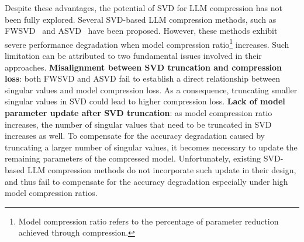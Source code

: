 Despite these advantages, the potential of SVD for LLM compression has not been fully explored. Several SVD-based LLM compression methods, such as FWSVD~\citep{DBLP:conf/iclr/HsuHCLSJ22} and ASVD~\citep{DBLP:journals/corr/abs-2312-05821} have been proposed. However, these methods exhibit severe performance degradation when model compression ratio\footnote{Model compression ratio refers to the percentage of parameter reduction achieved through compression.} increases. 
%
Such limitation can be attributed to two fundamental issues involved in their approaches.
%
 \textbf{Misalignment between SVD truncation and compression loss}:
%
both FWSVD and ASVD fail to establish a direct relationship between singular values and model compression loss. As a consequence, truncating smaller singular values in SVD could lead to higher compression loss.
%
 \textbf{Lack of model parameter update after SVD truncation}: 
as model compression ratio increases, the number of singular values that need to be truncated in SVD increases as well. To compensate for the accuracy degradation caused by truncating a larger number of singular values, it becomes necessary to update the remaining parameters of the compressed model.
Unfortunately, existing SVD-based LLM compression methods do not incorporate such update in their design, and thus fail to compensate for the accuracy degradation especially under high model compression ratios. 


